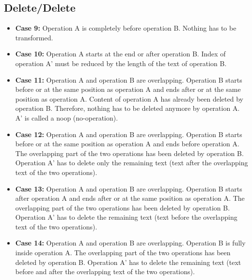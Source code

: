 \subsection{Delete/Delete}
\begin{itemize}
\item \textbf{Case 9:}
Operation A is completely before operation B. Nothing has to be transformed.
\item \textbf{Case 10:}
Operation A starts at the end or after operation B. Index of operation A' must be reduced by the length of the text of operation B.
\item \textbf{Case 11:}
Operation A and operation B are overlapping. Operation B starts before or at the same position as operation A and ends after or at the same position as operation A. Content of operation A has already been deleted by operation B. Therefore, nothing has to be deleted anymore by operation A. A' is called a noop (no-operation).
\item \textbf{Case 12:}
Operation A and operation B are overlapping. Operation B starts before or at the same position as operation A and ends before operation A. The overlapping part of the two operations has been deleted by operation B. Operation A' has to delete only the remaining text (text after the overlapping text of the two operations).
\item \textbf{Case 13:}
Operation A and operation B are overlapping. Operation B starts after operation A and ends after or at the same position as operation A. The overlapping part of the two operations has been deleted by operation B. Operation A' has to delete the remaining text (text before the overlapping text of the two operations).
\item \textbf{Case 14:}
Operation A and operation B are overlapping. Operation B is fully inside operation A. The overlapping part of the two operations has been deleted by operation B. Operation A' has to delete the remaining text (text before and after the overlapping text of the two operations).
\end{itemize}
